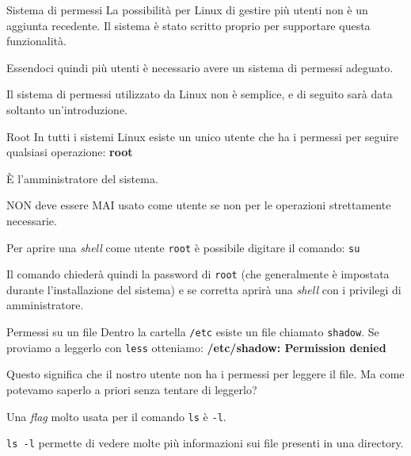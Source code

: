 \documentclass{beamer}
\begin{document}
\begin{frame}{Sistema di permessi}
  La possibilità per Linux di gestire più utenti non è un aggiunta recedente. Il 
  sistema è stato scritto proprio per supportare questa funzionalità.\bigskip

  Essendoci quindi più utenti è necessario avere un sistema di permessi 
  adeguato.\bigskip

  Il sistema di permessi utilizzato da Linux non è semplice, e di seguito sarà
  data soltanto un'introduzione.\bigskip
\end{frame}

\begin{frame}{Root}
  In tutti i sistemi Linux esiste un unico utente che ha i permessi per seguire
  qualsiasi operazione: \textbf{root}\bigskip

  È l'amministratore del sistema.\bigskip

  NON deve essere MAI usato come utente se non per le operazioni strettamente
  necessarie.\bigskip

  Per aprire una \textit{shell} come utente \texttt{root} è possibile digitare
  il comando: \texttt{su}\bigskip

  Il comando chiederà quindi la password di \texttt{root} (che generalmente è
  impostata durante l'installazione del sistema) e se corretta aprirà una 
  \textit{shell} con i privilegi di amministratore.
\end{frame}

\begin{frame}{Permessi su un file}
  Dentro la cartella \texttt{/etc} esiste un file chiamato \texttt{shadow}. 
  Se proviamo a leggerlo con \texttt{less} otteniamo: \textbf{/etc/shadow: 
  Permission denied}\bigskip

  Questo significa che il nostro utente non ha i permessi per leggere il file.
  Ma come potevamo saperlo a priori senza tentare di leggerlo?\pause\bigskip

  Una \textit{flag} molto usata per il comando \texttt{ls} è 
  \texttt{-l}.\bigskip

  \texttt{ls -l} permette di vedere molte più informazioni sui file presenti in
  una directory.
\end{frame}
\end{document}

